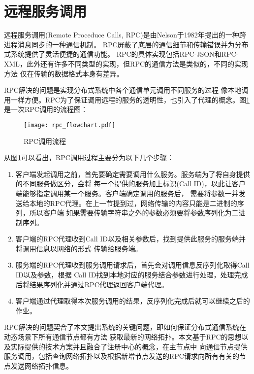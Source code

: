 \section{远程服务调用}
远程服务调用(Remote Proceduce Calls, RPC)是由Nelson于1982年提出的一种跨进程消息同步的一种通信机制\cite{Andrew}。
RPC屏蔽了底层的通信细节和传输错误并为分布式系统提供了灵活便捷的通信功能。
RPC的具体实现包括RPC-JSON和RPC-XML\cite{2011TOWARD,2013Web}，此外还有许多不同类型的实现，但RPC的通信方法是类似的，不同的实现方法
仅在传输的数据格式本身有差异。

RPC解决的问题是实现分布式系统中各个通信单元调用不同服务的过程
像本地调用一样方便。RPC为了保证调用远程的服务的透明性，也引入了代理的概念\cite{5694349}。图\ref{rpc_flowchart}是一次RPC调用的流程图：
\begin{figure}[H]
  \centering
  \texttt{[image: rpc\_flowchart.pdf]}
  \caption{RPC调用流程}
  \label{rpc_flowchart}
\end{figure}
从图\ref{rpc_flowchart}可以看出，RPC调用过程主要分为以下几个步骤：
\begin{enumerate}
  \item 客户端发起调用之前，首先要确定需要调用什么服务。服务端为了将自身提供的不同服务做区分，会将
  每一个提供的服务加上标识(Call ID)，以此让客户端能够指定调用某一个服务。客户端确定调用的服务后，
  需要将参数一并发送给本地的RPC代理。在上一节提到过，网络传输的内容只能是二进制的序列，所以客户端
  如果需要传输字符串之外的参数必须要将参数序列化为二进制序列。
  \item 客户端的RPC代理收到Call ID以及相关参数后，找到提供此服务的服务端并将调用信息以网络的形式
  传输给服务端。
  \item 服务端的RPC代理收到服务调用请求后，首先会对调用信息反序列化取得Call ID以及参数，根据
  Call ID找到本地对应的服务结合参数进行处理，处理完成后将结果序列化并通过RPC代理返回客户端代理。
  \item 客户端通过代理取得本次服务调用的结果，反序列化完成后就可以继续之后的作业。
\end{enumerate}

RPC解决的问题契合了本文提出系统的关键问题，即如何保证分布式通信系统在动态场景下所有通信节点都有方法
获取最新的网络拓扑。本文基于RPC的思想以及实际提供的技术方案并且融合了注册中心的概念，在主节点中
向通信节点提供服务调用，包括查询网络拓扑以及根据新增节点发送的RPC请求向所有有关的节点发送网络拓扑信息。

